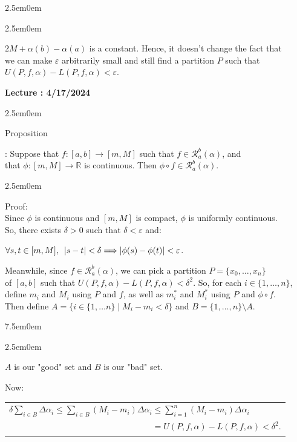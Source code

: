 \documentclass{book}
\newcommand{\hTwo}{%
   \color{MidnightBlue}%
   \fontsize{13}{15}\selectfont%
}
\newcommand{\hThree}{%
   \color{PineGreen!85!Orange}
   \fontsize{13}{15}\selectfont%
}
\newcommand{\teachComment}{
   \color{Orange}%
   \fontsize{12}{14}\selectfont%
}
\newenvironment{myIndent}{%
   \begin{adjustwidth}{2.5em}{0em}%
}{%
   \end{adjustwidth}%
}
\newenvironment{myTindent}{%
   \begin{adjustwidth}{7.5em}{0em}%
}{%
   \end{adjustwidth}%
}
\newcommand{\myHS}{ \hspace{0.5em}}
\newcounter{PropNumber}
\newcommand{\propCount}[1][1]{%
   \addtocounter{PropNumber}{#1}%
   \thePropNumber%
}
\newcommand{\retTwo}{\hfill\bigbreak}
\newcounter{LectureNumber}
\newcommand*{\markLecture}[1]{%
   \stepcounter{LectureNumber}%
   {\huge \color{Black} \textbf{Lecture \theLectureNumber: #1} \newline}%
}
\begin{document}
{\begin{myIndent}
{\begin{myIndent}
      $2M + \alpha(b) - \alpha(a)$ is a constant. Hence, it doesn't change the fact that\\ we can make $\varepsilon$ arbitrarily small and still find a partition $P$ such that\\ $U(P, f, \alpha) - L(P, f, \alpha) < \varepsilon$.\retTwo
   \end{myIndent}}
\end{myIndent}}

\markLecture{4/17/2024}


{\begin{myIndent}\hTwo
   Proposition \propCount: Suppose that $f: [a, b] \longrightarrow [m, M]$ such that $f \in \mathscr{R}_a^b(\alpha)$, and\\ that $\phi: [m, M] \longrightarrow \mathbb{R}$ is continuous. Then $\phi \circ f \in \mathscr{R}_a^b(\alpha)$.
   
   {\begin{myIndent}\hThree
      Proof:\\
      Since $\phi$ is continuous and $[m, M]$ is compact, $\phi$ is uniformly continuous.\\ So, there exists $\delta > 0$ such that $\delta < \varepsilon$ and:
      
      {\centering$\forall s, t \in [m, M],\myHS |s-t| < \delta \Longrightarrow |\phi(s) - \phi(t)| < \varepsilon$.\retTwo\par}

      Meanwhile, since $f \in \mathscr{R}_a^b(\alpha)$, we can pick a partition $P = \{x_0, \ldots, x_n\}$\\ of $[a, b]$ such that $U(P, f, \alpha) - L(P, f, \alpha) < \delta^2$. So, for each $i \in \{1, \ldots, n\}$,\\ define $m_i$ and $M_i$ using $P$ and $f$, as well as $m_i^*$ and $M_i^*$ using $P$ and $\phi \circ f$.\\ Then define $A = \{i \in \{1, \ldots n\} \mid M_i - m_i < \delta\}$ and $B = \{1, \ldots, n\} \setminus A$.\\ [-9pt]
      
      {\begin{myTindent}\begin{myIndent}\teachComment
         $A$ is our "good" set and $B$ is our "bad" set.
      \end{myIndent}\end{myTindent}}

      Now:
      
      \begin{tabular}{l}
         $\delta \sum\limits_{i \in B}\Delta \alpha_i \leq \sum\limits_{i \in B}(M_i - m_i)\Delta \alpha_i \leq \sum\limits_{i=1}^n(M_i - m_i)\Delta \alpha_i$\\ [4pt]
         $\phantom{\delta \sum\limits_{i \in B}\Delta \alpha_i \leq \sum\limits_{i \in B}(M_i - m_i)\Delta \alpha_i} = U(P, f, \alpha) - L(P, f, \alpha) < \delta^2$.\retTwo
      \end{tabular}


\end{myIndent}}
\end{myIndent}}
\end{document}

